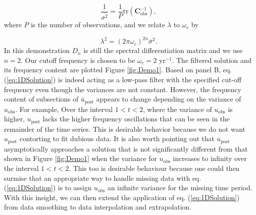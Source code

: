 \documentclass[10pt,a4paper]{article}
\begin{document}
\begin{equation}
\frac{1}{\bar{\sigma^2}} = \frac{1}{P} \mathrm{tr}\left(\mathbf{C}_\mathrm{obs}^{-1}\right),
\end{equation}
where $P$ is the number of observations, and we relate $\lambda$ to $\omega_c$ by

\begin{equation}\label{eq:VariableChange2}
\lambda^2 = (2\pi\omega_c)^{2n}\bar{\sigma}^2.  
\end{equation}
In this demonstration $D_n$ is still the spectral differentiation matrix and we use $n=2$. Our cutoff frequency is chosen to be $\omega_c=2$ yr$^{-1}$.  The filtered solution and its frequency content are plotted Figure \ref{fig:Demo1}. Based on panel B, eq. (\ref{eq:1DSolution}) is indeed acting as a low-pass filter with the specified cut-off frequency even though the variances are not constant.  However, the frequency content of subsections of $\bar{u}_\mathrm{post}$ appears to change depending on the variance of $u_\mathrm{obs}$. For example, Over the interval $1<t<2$, where the variance of $u_\mathrm{obs}$ is higher, $u_\mathrm{post}$ lacks the higher frequency oscillations that can be seen in the remainder of the time series. This is desirable behavior because we do not want $u_\mathrm{post}$ contorting to fit dubious data.  It is also worth pointing out that $u_\mathrm{post}$ asymptotically approaches a solution that is not significantly different from that shown in Figure \ref{fig:Demo1} when the variance for $u_\mathrm{obs}$ increases to infinity over the interval $1<t<2$.  This too is desirable behaviour because one could then surmise that an appropriate way to handle missing data with eq. (\ref{eq:1DSolution}) is to assign $u_\mathrm{obs}$ an infinite variance for the missing time period.  With this insight, we can then extend the application of eq. (\ref{eq:1DSolution}) from data smoothing to data interpolation and extrapolation.   
\end{document}
